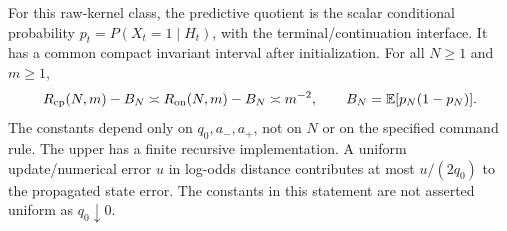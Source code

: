 \begin{theorem}\label{thm:hmm}
For this raw-kernel class, the predictive quotient is the scalar conditional probability $p_t=P(X_t=1\mid H_t)$, with the terminal/continuation interface. It has a common compact invariant interval after initialization. For all $N\ge1$ and $m\ge1$,
\begin{equation}\label{eq:hmm-law}
 R_{\mathrm{cp}}(N,m)-B_N\asymp R_{\mathrm{on}}(N,m)-B_N\asymp m^{-2},
 \qquad B_N=\mathbb E[p_N(1-p_N)].
\end{equation}
The constants depend only on $q_0,a_-,a_+$, not on $N$ or on the specified command rule. The upper has a finite recursive implementation. A uniform update/numerical error $u$ in log-odds distance contributes at most $u/(2q_0)$ to the propagated state error. The constants in this statement are not asserted uniform as $q_0\downarrow0$.
\end{theorem}
